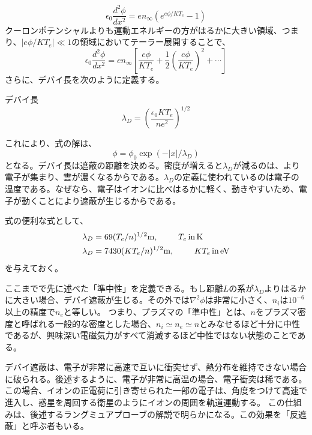 \documentclass{ltjsarticle}
\numberwithin{equation}{section} %
\begin{document}
\[
\epsilon_0 \frac{d^2\phi}{dx^2}= en_\infty(e^{e\phi/KT_e} - 1)
\]
クーロンポテンシャルよりも運動エネルギーの方がはるかに大きい領域、つまり、$|e\phi / KT_e| \ll 1$の領域においてテーラー展開することで、
\[
 \epsilon_0 \frac{d^2\phi}{dx^2} = en_\infty\left[\frac{e\phi}{KT_e}+ \frac{1}{2}(\frac{e\phi}{KT_e})^2 + \cdots \right] \label{telor.1}
\]
さらに、デバイ長を次のように定義する。
\begin{eqbox}{デバイ長}
\begin{equation}
 \lambda_D = \left(\dfrac{\epsilon_0 KT_e}{ne^2}\right)^{1/2} \label{debye}
\end{equation}
\end{eqbox}
これにより、式の解は、
\begin{equation}
  \phi = \phi_0 \exp(-|x|/\lambda_D) \label{debye.poten}
\end{equation}
となる。デバイ長は遮蔽の距離を決める。密度が増えると$\lambda_D$が減るのは、より電子が集まり、雲が濃くなるからである。$\lambda_D$の定義に使われているのは電子の温度である。なぜなら、電子はイオンに比べはるかに軽く、動きやすいため、電子が動くことにより遮蔽が生じるからである。

式の便利な式として、
\begin{align}
  \begin{split}
    \lambda_D &= 69(T_e/n)^{1/2}\si{\metre}, \hspace{2pc}  T_e\, \text{in} \, \si{\kelvin}\\
    \lambda_D &= 7430(KT_e/n)^{1/2}\si{\metre}, \hspace{2pc} KT_e\, \text{in} \, \si{\electronvolt}
  \end{split}
\end{align}
を与えておく。

ここまでで先に述べた「準中性」を定義できる。もし距離$L$の系が$\lambda_D$よりはるかに大きい場合、デバイ遮蔽が生じる。その外では$\nabla^2 \phi$は非常に小さく、$n_i$は$10^{-6}$以上の精度で$n_e$と等しい。
つまり、プラズマの「準中性」とは、$n$をプラズマ密度と呼ばれる一般的な密度とした場合、$n_i \simeq n_e \simeq n$とみなせるほど十分に中性であるが、興味深い電磁気力がすべて消滅するほど中性ではない状態のことである。 

デバイ遮蔽は、電子が非常に高速で互いに衝突せず、熱分布を維持できない場合に破られる。後述するように、電子が非常に高温の場合、電子衝突は稀である。この場合、イオンの正電荷に引き寄せられた一部の電子は、角度をつけて高速で進入し、惑星を周回する衛星のようにイオンの周囲を軌道運動する。
この仕組みは、後述するラングミュアプローブの解説で明らかになる。この効果を「反遮蔽」と呼ぶ者もいる。
\end{document}
